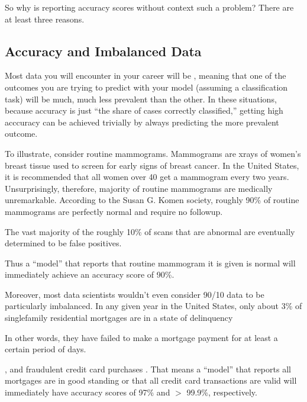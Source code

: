 \documentclass[letterpaper,10pt,english]{jupyterBook}
\begin{document}
\sphinxAtStartPar
So why is reporting accuracy scores without context such a problem? There are at least three reasons.


\subsection{Accuracy and Imbalanced Data}
\label{\detokenize{30_questions/26_passive_prediction_errors:accuracy-and-imbalanced-data}}
\sphinxAtStartPar
Most data you will encounter in your career will be , meaning that one of the outcomes you are trying to predict with your model (assuming a classification task) will be much, much less prevalent than the other. In these situations, because accuracy is just “the share of cases correctly classified,” getting high acccuracy can be achieved trivially by always predicting the more prevalent outcome.

\sphinxAtStartPar
To illustrate, consider routine mammograms. Mammograms are x\sphinxhyphen{}rays of women’s breast tissue used to screen for early signs of breast cancer. In the United States, it is recommended that all women over 40 get a mammogram every two years. Unsurprisingly, therefore,  majority of routine mammograms are medically unremarkable. According to the Susan G. Komen society, roughly 90\% of routine mammograms are perfectly normal and require no followup.%
\begin{footnote}[2]\sphinxAtStartFootnote
The vast majority of the roughly 10\% of scans that are abnormal are eventually determined to be false positives.
%
\end{footnote} Thus a “model” that reports that  routine mammogram it is given is normal will immediately achieve an accuracy score of 90\%.

\sphinxAtStartPar
Moreover, most data scientists wouldn’t even consider 90/10 data to be particularly imbalanced. In any given year in the United States, only about 3\% of single\sphinxhyphen{}family residential mortgages are in a state of delinquency%
\begin{footnote}[3]\sphinxAtStartFootnote
In other words, they have failed to make a mortgage payment for at least a certain period of days.
%
\end{footnote}, and fraudulent credit card purchases . That means a “model” that reports all mortgages are in good standing or that all credit card transactions are valid will immediately have accuracy scores of 97\% and \(>\) 99.9\%, respectively.
\end{document}
